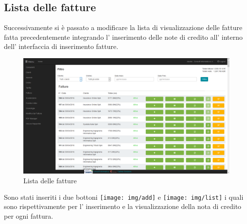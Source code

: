 \documentclass[12pt]{book}
\begin{document}
\subsection{Lista delle fatture}
Successivamente si è passato a modificare la lista di visualizzazione delle 
fatture fatta precedentemente 
integrando l' inserimento delle note di credito all' interno dell' interfaccia 
di inserimento fatture.
\begin{figure}[H]
    \centering
    \includegraphics[scale=0.4]{img/lista_fatture}
    \caption{Lista delle fatture}\label{img:lista_fatture}
\end{figure}
Sono stati inseriti i due bottoni \texttt{[image: img/add]} e 
\texttt{[image: img/list]} i quali sono rispettivamente per 
l' inserimento e la visualizzazione della nota di credito per ogni fattura.
\end{document}
